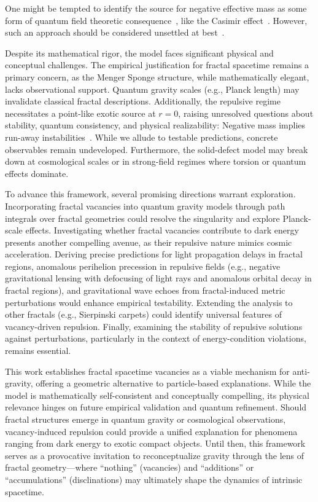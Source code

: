 \documentclass[%
  reprint,
  superscriptaddress,
  showpacs,
  showkeys,
  amsmath,amssymb,
  pra,
  longbibliography,
  floatfix,
  x11names
]{revtex4-2}
\begin{document}
One might be tempted to identify the source for negative effective mass as some form of quantum field theoretic consequence~\cite{kontou-2020},
like the Casimir effect~\cite{bekenstein-2013,costa-2022}.
However, such an approach should be considered unsettled at best~\cite{Santiago22-PhysRevD.105.064038}.

Despite its mathematical rigor, the model faces significant physical and conceptual challenges.
The empirical justification for fractal spacetime remains a primary concern, as the Menger Sponge structure,
while mathematically elegant, lacks observational support.
Quantum gravity scales (e.g., Planck length) may invalidate classical fractal descriptions.
Additionally, the repulsive regime necessitates a point-like exotic source at $r = 0$,
raising unresolved questions about stability, quantum consistency, and physical realizability:
Negative mass implies run-away instabilities~\cite{bondi-1957}.
While we allude to testable predictions, concrete observables remain undeveloped.
Furthermore, the solid-defect model may break down at cosmological scales or in strong-field regimes where torsion or quantum effects dominate.

To advance this framework, several promising directions warrant exploration.
Incorporating fractal vacancies into quantum gravity models through path integrals
over fractal geometries could resolve the singularity and explore Planck-scale effects.
Investigating whether fractal vacancies contribute to dark energy presents another compelling avenue,
as their repulsive nature mimics cosmic acceleration.
Deriving precise predictions for light propagation delays in fractal regions,
anomalous perihelion precession in repulsive fields (e.g., negative gravitational lensing with defocusing of light rays and anomalous orbital decay in fractal regions),
and gravitational wave echoes from fractal-induced metric perturbations would enhance empirical testability.
Extending the analysis to other fractals (e.g., Sierpinski carpets) could identify universal features of vacancy-driven repulsion.
Finally, examining the stability of repulsive solutions against perturbations, particularly in the context of energy-condition violations, remains essential.

This work establishes fractal spacetime vacancies as a viable mechanism for anti-gravity,
offering a geometric alternative to particle-based explanations.
 While the model is mathematically self-consistent and conceptually compelling,
its physical relevance hinges on future empirical validation and quantum refinement.
Should fractal structures emerge in quantum gravity or cosmological observations,
vacancy-induced repulsion could provide a unified explanation for phenomena ranging from dark energy to exotic compact objects.
Until then, this framework serves as a provocative invitation to reconceptualize gravity
through the lens of fractal geometry---where ``nothing'' (vacancies) and ``additions'' or ``accumulations'' (disclinations) may ultimately shape the dynamics of intrinsic spacetime.
\end{document}
